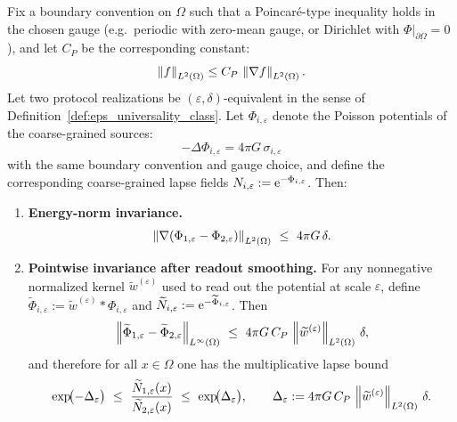 \begin{proposition}
\label{prop:eps_invariance_lapse}
Fix a boundary convention on $\Omega$ such that a Poincar\'e-type inequality holds in the chosen gauge (e.g.\ periodic with zero-mean gauge, or Dirichlet with $\Phi|_{\partial\Omega}=0$), and let $C_P$ be the corresponding constant:
\[
\left\lVert f\right\rVert_{L^2(\Omega)}\le C_P\,\left\lVert \nabla f\right\rVert_{L^2(\Omega)}.
\]
Let two protocol realizations be $(\varepsilon,\delta)$-equivalent in the sense of Definition~\ref{def:eps_universality_class}.
Let $\Phi_{i,\varepsilon}$ denote the Poisson potentials of the coarse-grained sources:
\[
-\Delta\Phi_{i,\varepsilon}=4\pi G\,\sigma_{i,\varepsilon}
\]
with the same boundary convention and gauge choice, and define the corresponding coarse-grained lapse fields $N_{i,\varepsilon}:=\mathrm{e}^{-\Phi_{i,\varepsilon}}$.
Then:
\begin{enumerate}
\item \textbf{Energy-norm invariance.}
\[
\norm{\nabla(\Phi_{1,\varepsilon}-\Phi_{2,\varepsilon})}_{L^2(\Omega)}\ \le\ 4\pi G\,\delta.
\]
\item \textbf{Pointwise invariance after readout smoothing.}
For any nonnegative normalized kernel $\widetilde w^{(\varepsilon)}$ used to read out the potential at scale $\varepsilon$, define $\widetilde\Phi_{i,\varepsilon}:=\widetilde w^{(\varepsilon)}\ast\Phi_{i,\varepsilon}$ and $\widetilde N_{i,\varepsilon}:=\mathrm{e}^{-\widetilde\Phi_{i,\varepsilon}}$.
Then
\[
\left\lVert \widetilde\Phi_{1,\varepsilon}-\widetilde\Phi_{2,\varepsilon}\right\rVert_{L^\infty(\Omega)}
\ \le\
4\pi G\,C_P\,\left\lVert \widetilde w^{(\varepsilon)}\right\rVert_{L^2(\Omega)}\,\delta,
\]
and therefore for all $x\in\Omega$ one has the multiplicative lapse bound
\[
\exp\!\bigl(-\Delta_\varepsilon\bigr)\ \le\ \frac{\widetilde N_{1,\varepsilon}(x)}{\widetilde N_{2,\varepsilon}(x)}\ \le\ \exp\!\bigl(\Delta_\varepsilon\bigr),
\qquad
\Delta_\varepsilon:=4\pi G\,C_P\,\norm{\widetilde w^{(\varepsilon)}}_{L^2(\Omega)}\,\delta.
\]
\end{enumerate}
\end{proposition}

